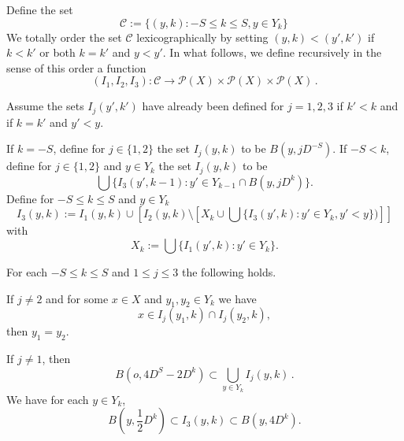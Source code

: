 Define the set
\begin{equation}
    \mathcal{C}:= \{(y,k): -S\le k\le S, y\in Y_k\}\,
\end{equation}
We totally order the set $\mathcal{C}$ lexicographically by setting
$(y,k)<(y',k')$ if $k< k'$ or both $k=k'$ and $y<y'$.
In what follows, we define recursively in the sense of this order a function
\begin{equation}
    (I_1,I_2,I_3): \mathcal{C}\to \mathcal{P}(X)\times \mathcal{P}(X)\times \mathcal{P}(X)\, .
\end{equation}


Assume the sets ${I}_j(y',k')$ have already been defined for $j=1,2,3$ if $k'<k$ and if $k=k'$ and $y'<y$.




If $k=-S$, define for $j\in \{1,2\}$ the set
${I}_j(y,k)$ to be $B(y,jD^{-S})$.
If $-S<k$, define for $j\in \{1,2\}$
and $y\in Y_k$ the set ${I}_j(y,k)$ to be
\begin{equation}\label{defineij}
\bigcup\{I_3(y',k-1):
y'\in Y_{k-1}\cap B(y,jD^k)\}.
\end{equation}
Define for {$-S\leq k\leq S$} and $y\in Y_k$
\begin{equation}\label{definei3}
I_3(y,k):={I_1}(y,k)\cup \left[{I_2}(y,k)\setminus \left[X_k\cup \bigcup\{I_3(y',k):y'\in Y_{k}, y'<y\})\right]\right]
\end{equation}
with
\begin{equation}
      X_{k}:=\bigcup\{I_1(y', k):y'\in Y_{k}\}.
\end{equation}


\begin{lemma}
    \label{basic-grid-structure}
    \leanok
    For each $-S\le k\le S$ and $1\le j\le 3$
    the following holds.

    If $j\neq 2$ and for some $x\in X$ and $y_1,y_2\in Y_k$ we have
    \begin{equation}\label{disji}
        x\in I_j(y_1,k)\cap I_j(y_2,k),
    \end{equation}
    then $y_1=y_2$.

    If $j\neq 1$, then
    \begin{equation}\label{unioni}
    B(o, 4D^S-2D^k)\subset \bigcup_{y\in Y_k} I_j(y,k)\, .
    \end{equation}
    We have for each $y\in Y_k$,
    \begin{equation}\label{squeezedyadic}
        B(y,\frac 12 D^k) \subset I_3(y,k)\subset
        B(y,4D^k).
    \end{equation}
\end{lemma}

